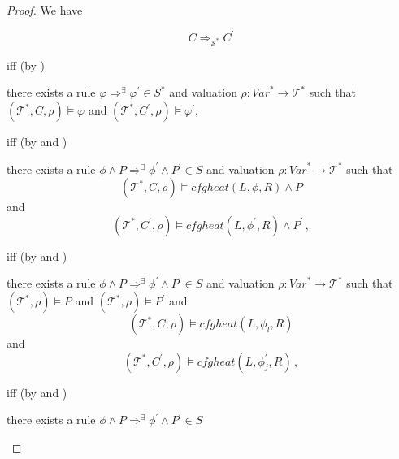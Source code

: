 \begin{proof}
We have
\begin{proofenv}
    \begin{equation*}
        C \Rightarrow_{\mathcal{S}^*} C^\prime
    \end{equation*}
\end{proofenv}
iff (by )
\begin{proofenv}
    there exists a rule $\varphi \Rightarrow^\exists \varphi^\prime \in S^*$
    and valuation $\rho : \mathit{Var}^* \to \mathcal{T}^*$ such that
    $(\mathcal{T}^*, C, \rho) \vDash \varphi$
    and $(\mathcal{T}^*, C^\prime, \rho) \vDash \varphi^\prime$,
\end{proofenv}
iff (by
 and )
\begin{proofenv}
    there exists a rule $\phi \land P \Rightarrow^\exists \phi^\prime \land P^\prime \in S$
    and valuation $\rho : \mathit{Var}^* \to \mathcal{T}^*$ such that
    \begin{equation*}
    (\mathcal{T}^*, C, \rho) \vDash \mathit{cfgheat}(L, \phi, R) \land P
    \end{equation*}
    and
    \begin{equation*}
        (\mathcal{T}^*, C^\prime, \rho) \vDash
        \mathit{cfgheat}(L, \phi^\prime, R) \land P^\prime \, ,
    \end{equation*}
\end{proofenv}
iff (by  and )
\begin{proofenv}
    there exists a rule $\phi \land P \Rightarrow^\exists \phi^\prime \land P^\prime \in S$
    and valuation $\rho : \mathit{Var}^* \to \mathcal{T}^*$ such that
    $(\mathcal{T}^*, \rho) \vDash P$ and $(\mathcal{T}^*, \rho) \vDash P^\prime$ and
    \begin{equation*}
        (\mathcal{T}^*, C, \rho) \vDash \mathit{cfgheat}(L, \phi_l, R)
    \end{equation*}
    and
    \begin{equation*}
        (\mathcal{T}^*, C^\prime, \rho) \vDash
        \mathit{cfgheat}(L, \phi^\prime_j, R) \, ,
    \end{equation*}
\end{proofenv}
iff (by  and )
\begin{proofenv}
    there exists a rule $\phi \land P \Rightarrow^\exists \phi^\prime \land P^\prime \in S$

\end{proofenv}
\end{proof}
